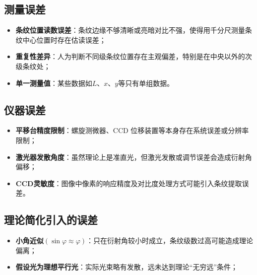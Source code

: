 \documentclass[12pt,a4paper]{article}
\begin{document}
    \subsection{测量误差}
        \begin{itemize}
            \item \textbf{条纹位置读数误差}：条纹边缘不够清晰或亮暗对比不强，使得用千分尺测量条纹中心位置时存在估读误差；
            \item \textbf{重复性差异}：人为判断不同级条纹位置存在主观偏差，特别是在中央以外的次级条纹处；
            \item \textbf{单一测量值}：某些数据如$L$、$x$、$y$等只有单组数据。
        \end{itemize}
    \subsection{仪器误差}
        \begin{itemize}
            \item \textbf{平移台精度限制}：螺旋测微器、CCD 位移装置等本身存在系统误差或分辨率限制；
            \item \textbf{激光器发散角度}：虽然理论上是准直光，但激光发散或调节误差会造成衍射角偏移；
            \item \textbf{CCD灵敏度}：图像中像素的响应精度及对比度处理方式可能引入条纹提取误差。
        \end{itemize}
    \subsection{理论简化引入的误差}
        \begin{itemize}
            \item \textbf{小角近似$(\sin\varphi\approx\varphi)$}：只在衍射角较小时成立，条纹级数过高可能造成理论偏离；
            \item \textbf{假设光为理想平行光}：实际光束略有发散，远未达到理论“无穷远”条件；
        \end{itemize}
\end{document}
